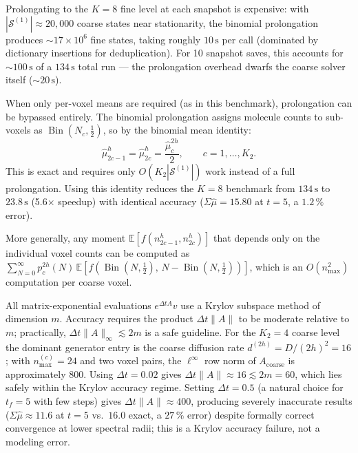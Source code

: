 \documentclass[review,onefignum,onetabnum]{siamart171218}
\newcommand{\calS}{\mathcal{S}}
\newcommand{\E}{\mathbb{E}}
\newcommand{\Bin}{\operatorname{Bin}}
\begin{document}
\begin{remark}
  \label{rem:coarse-means}
  Prolongating to the $K = 8$ fine level at each snapshot is expensive:
  with $|\calS^{(1)}| \approx 20{,}000$ coarse states near stationarity,
  the binomial prolongation produces ${\sim}17 \times 10^6$ fine states,
  taking roughly $10\,\mathrm{s}$ per call (dominated by dictionary
  insertions for deduplication).  For 10 snapshot saves, this accounts
  for ${\sim}100\,\mathrm{s}$ of a $134\,\mathrm{s}$ total run --- the
  prolongation overhead dwarfs the coarse solver itself (${\sim}20\,\mathrm{s}$).

  When only per-voxel means are required (as in this benchmark),
  prolongation can be bypassed entirely.  The binomial prolongation
  assigns molecule counts to sub-voxels as
  $\Bin(N_c, \tfrac{1}{2})$, so by the binomial mean identity:
  \begin{equation}
    \label{eq:coarse-mean-split}
    \hat\mu^h_{2c-1} = \hat\mu^h_{2c} = \frac{\hat\mu^{2h}_c}{2},
    \qquad c = 1, \ldots, K_2.
  \end{equation}
  This is exact and requires only $O(K_2 |\calS^{(1)}|)$ work instead
  of a full prolongation.  Using this identity reduces the $K = 8$
  benchmark from $134\,\mathrm{s}$ to $23.8\,\mathrm{s}$ (5.6$\times$
  speedup) with identical accuracy ($\Sigma\hat\mu = 15.80$ at $t=5$,
  a $1.2\,\%$ error).

  More generally, any moment $\E[f(n^h_{2c-1}, n^h_{2c})]$ that depends
  only on the individual voxel counts can be computed as
  $\sum_{N=0}^{\infty} p^{2h}_c(N)\, \E[f(\Bin(N,\tfrac12),\, N - \Bin(N,\tfrac12))]$,
  which is an $O(n_{\max}^2)$ computation per coarse voxel.
\end{remark}

\begin{remark}
  \label{rem:krylov}
  All matrix-exponential evaluations $e^{\Delta t A}v$ use a Krylov
  subspace method of dimension $m$.  Accuracy requires the product
  $\Delta t \|A\|$ to be moderate relative to $m$; practically,
  $\Delta t \|A\|_\infty \lesssim 2m$ is a safe guideline.
  For the $K_2 = 4$ coarse level the dominant generator entry is the
  coarse diffusion rate $d^{(2h)} = D/(2h)^2 = 16$; with
  $n_{\max}^{(c)} = 24$ and two voxel pairs, the $\ell^\infty$ row
  norm of $A_{\mathrm{coarse}}$ is approximately 800.  Using
  $\Delta t = 0.02$ gives $\Delta t\|A\| \approx 16 \lesssim 2m = 60$,
  which lies safely within the Krylov accuracy regime.  Setting
  $\Delta t = 0.5$ (a natural choice for $t_f = 5$ with few steps)
  gives $\Delta t\|A\| \approx 400$, producing severely inaccurate
  results ($\Sigma\hat\mu \approx 11.6$ at $t = 5$ vs.\ $16.0$ exact,
  a $27\,\%$ error) despite formally correct convergence at lower spectral
  radii; this is a Krylov accuracy failure, not a modeling error.
\end{remark}
\end{document}
